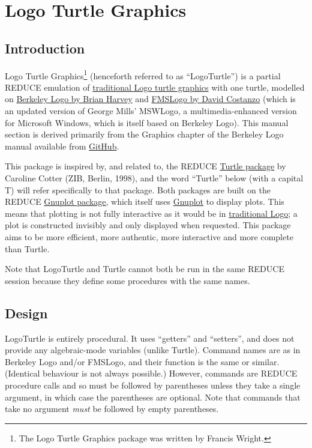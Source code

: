 \section{Logo Turtle Graphics}

\subsection{Introduction}

Logo Turtle Graphics\footnote{The Logo Turtle Graphics package was
written by Francis Wright.} (henceforth referred to as ``LogoTurtle'')
is a partial REDUCE emulation of
\href{https://en.wikipedia.org/wiki/Turtle_graphics}{traditional Logo
  turtle graphics} with one turtle, modelled on
\href{http://people.eecs.berkeley.edu/~bh/logo.html}{Berkeley Logo by
  Brian Harvey} and \href{https://fmslogo.sourceforge.io/}{FMSLogo by
  David Costanzo} (which is an updated version of George Mills'
MSWLogo, a multimedia-enhanced version for Microsoft Windows, which is
itself based on Berkeley Logo).  This manual section is derived
primarily from the Graphics chapter of the Berkeley Logo manual
available from
\href{https://github.com/jrincayc/ucblogo-code}{GitHub}.

This package is inspired by, and related to, the REDUCE
\hyperref[package:TURTLE]{Turtle package} by Caroline Cotter (ZIB,
Berlin, 1998), and the word ``Turtle'' below (with a capital T) will
refer specifically to that package.  Both packages are built on the
REDUCE \hyperref[package:GNUPLOT]{Gnuplot package}, which itself uses
\href{http://gnuplot.info/}{Gnuplot} to display plots.  This means
that plotting is not fully interactive as it would be in
\href{https://en.wikipedia.org/wiki/Logo_(programming_language)}{traditional
  Logo}; a plot is constructed invisibly and only displayed when
requested.  This package aims to be more efficient, more authentic,
more interactive and more complete than Turtle.

Note that LogoTurtle and Turtle cannot both be run in the same REDUCE
session because they define some procedures with the same names.

\subsection{Design}

LogoTurtle is entirely procedural.  It uses ``getters'' and
``setters'', and does not provide any algebraic-mode variables (unlike
Turtle).  Command names are as in Berkeley Logo and/or FMSLogo, and
their function is the same or similar.  (Identical behaviour is not
always possible.)  However, commands are REDUCE procedure calls and so
must be followed by parentheses unless they take a single argument, in
which case the parentheses are optional.  Note that commands that take
no argument \emph{must} be followed by empty parentheses.

